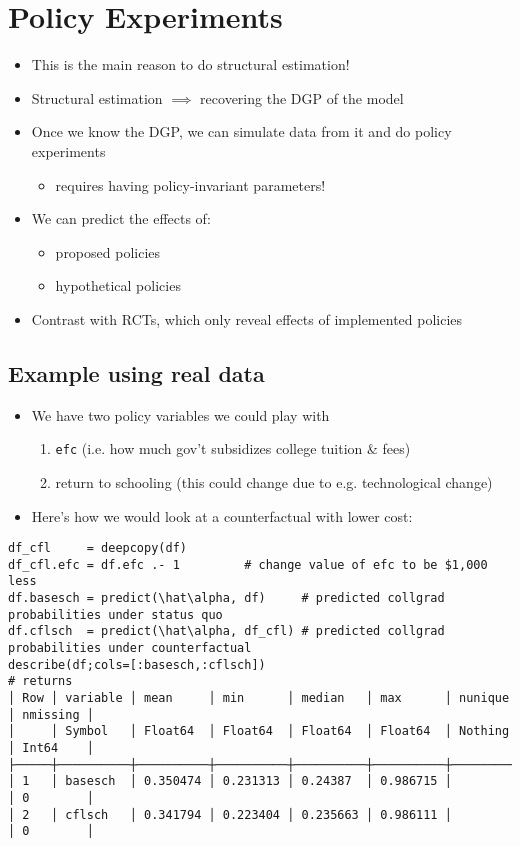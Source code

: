 \documentclass[11pt]{article}
\begin{document}
\section{Policy Experiments}
\label{sec:org8d5414e}

\begin{itemize}
\item This is the main reason to do structural estimation!
\item Structural estimation \(\implies\) recovering the DGP of the model
\item Once we know the DGP, we can simulate data from it and do policy experiments
\begin{itemize}
\item requires having policy-invariant parameters!
\end{itemize}
\item We can predict the effects of:
\begin{itemize}
\item proposed policies
\item hypothetical policies
\end{itemize}
\item Contrast with RCTs, which only reveal effects of implemented policies
\end{itemize}


\subsection{Example using real data}
\label{sec:org5e8fe50}

\begin{itemize}
\item We have two policy variables we could play with

\begin{enumerate}
\item \texttt{efc} (i.e. how much gov't subsidizes college tuition \& fees)
\item return to schooling (this could change due to e.g. technological change)
\end{enumerate}

\item Here's how we would look at a counterfactual with lower cost:
\end{itemize}
\begin{verbatim}
df_cfl     = deepcopy(df)
df_cfl.efc = df.efc .- 1         # change value of efc to be $1,000 less
df.basesch = predict(\hat\alpha, df)     # predicted collgrad probabilities under status quo
df.cflsch  = predict(\hat\alpha, df_cfl) # predicted collgrad probabilities under counterfactual
describe(df;cols=[:basesch,:cflsch])
# returns
│ Row │ variable │ mean     │ min      │ median   │ max      │ nunique │ nmissing │
│     │ Symbol   │ Float64  │ Float64  │ Float64  │ Float64  │ Nothing │ Int64    │
├─────┼──────────┼──────────┼──────────┼──────────┼──────────┼─────────┼──────────┤
│ 1   │ basesch  │ 0.350474 │ 0.231313 │ 0.24387  │ 0.986715 │         │ 0        │
│ 2   │ cflsch   │ 0.341794 │ 0.223404 │ 0.235663 │ 0.986111 │         │ 0        │
\end{verbatim}
\end{document}
